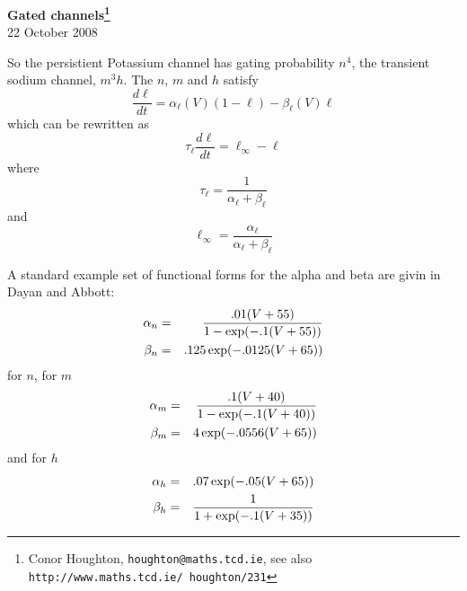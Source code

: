 \documentclass[12pt]{article}
\begin{document}
\begin{center}
{\bf Gated channels\footnote{Conor Houghton, {\tt houghton@maths.tcd.ie},
see also {\tt http://www.maths.tcd.ie/ houghton/231}}}\\[1cm]{} 22 October 2008
\end{center}
So the persistient Potassium channel has gating probability $n^4$, the transient sodium channel, $m^3h$. The $n$, $m$ and $h$ satisfy 
\begin{equation}
\frac{d\ell}{dt}=\alpha_{\ell}(V)(1-\ell)-\beta_{\ell}(V)\ell
\end{equation}
which can be rewritten as
\begin{equation}
\tau_{\ell}\frac{d\ell}{dt}=\ell_{\infty}-\ell
\end{equation}
where
\begin{equation}
\tau_{\ell}=\frac{1}{\alpha_{\ell}+\beta_{\ell}}
\end{equation}
and
\begin{equation}
\ell_{\infty}=\frac{\alpha_{\ell}}{\alpha_{\ell}+\beta_{\ell}}
\end{equation}

A standard example set of functional forms for  the alpha and beta are givin in Dayan and Abbott:
\begin{eqnarray}
\alpha_n&=&\frac{.01(V+55)}{1-\exp(-.1(V+55))}\cr
\beta_n&=&.125\exp(-.0125(V+65))
\end{eqnarray}
for $n$, for $m$
\begin{eqnarray}
\alpha_m&=& \frac{.1(V+40)}{1-\exp(-.1(V+40))}\cr
\beta_m&=&4\exp(-.0556(V+65))
\end{eqnarray}
and for $h$
\begin{eqnarray}
\alpha_h&=&.07\exp(-.05(V+65))\cr
\beta_h&=&\frac{1}{1+\exp(-.1(V+35))}
\end{eqnarray}
\end{document}
